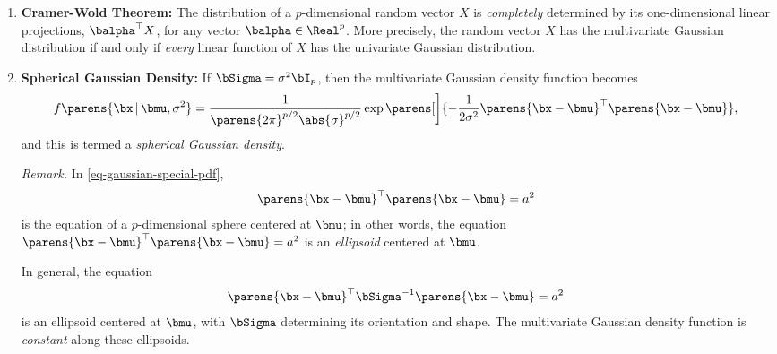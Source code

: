 \documentclass[12pt]{article}
\begin{document}
\begin{enumerate}[label=\textbf{\arabic*.}]
	\item \textbf{Cramer-Wold Theorem:} The distribution of a $p$-dimensional random vector $X$ is \textit{completely} determined by its one-dimensional linear projections, $\balpha^\top X$, for any vector $\balpha \in \Real^p$. More precisely, the random vector $X$ has the multivariate Gaussian distribution if and only if \emph{every} linear function of $X$ has the univariate Gaussian distribution. 
	
	\item \textbf{Spherical Gaussian Density:} If $\bSigma = \sigma^2 \bI_p$, then the multivariate Gaussian density function becomes 
	\begin{align}\label{eq-gaussian-special-pdf}
		f \parens{\bx \,\vert\, \bmu, \sigma^2} = \frac{1}{ \parens{2\pi}^{p/2} \abs{\sigma}^{p/2}} \exp \parens[\bigg]{-\frac{1}{2\sigma^2} \parens{\bx - \bmu}^\top \parens{\bx - \bmu}}, 
	\end{align}
	and this is termed a \textit{spherical Gaussian density}. 
	
	\textit{Remark.} In \eqref{eq-gaussian-special-pdf}, 
	\begin{align*}
		\parens{\bx - \bmu}^\top \parens{\bx - \bmu} = a^2 
	\end{align*}
	is the equation of a $p$-dimensional sphere centered at $\bmu$; in other words, the equation $\parens{\bx - \bmu}^\top \parens{\bx - \bmu} = a^2$ is an \textit{ellipsoid} centered at $\bmu$. 
	
	In general, the equation 
	\begin{align*}
		\parens{\bx - \bmu}^\top \bSigma^{-1} \parens{\bx - \bmu} = a^2 
	\end{align*}
	is an ellipsoid centered at $\bmu$, with $\bSigma$ determining its orientation and shape. The multivariate Gaussian density function is \textit{constant} along these ellipsoids. 
	

\end{enumerate}
\end{document}
